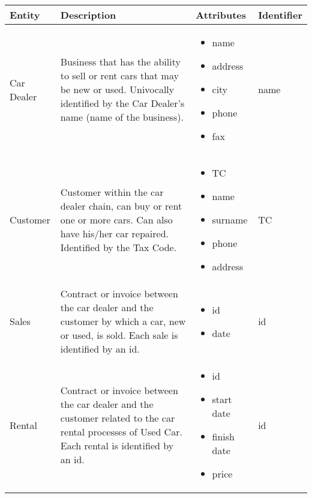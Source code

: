 \begin{longtable}{|p{}|p{} |p{}|p{} |} 
\hline
\textbf{Entity} & \textbf{Description} & \textbf{Attributes} & \textbf{Identifier}  \\\hline


Car Dealer & Business that has the ability to sell or rent cars that may be new or used. Univocally identified by the Car Dealer's name (name of the business). & \begin{itemize}
        \vspace{-1em}
        \item name
        \item address
        \item city
        \item phone
        \item fax
    \end{itemize}
& name\\\hline
 
 Customer & Customer within the car dealer chain, can buy or rent one or more cars. Can also have his/her car repaired. Identified by the Tax Code. & \begin{itemize}
        \vspace{-1em}
        \item TC
        \item name
        \item surname
        \item phone
        \item address
    \end{itemize}
 &  TC \\\hline

 Sales & Contract or invoice between the car dealer and the customer by which a car, new or used, is sold. Each sale is identified by an id. & \begin{itemize}
    \vspace{-1em}
    \item id
    \item date
    \end{itemize}
& id \\\hline

Rental & Contract or invoice between the car dealer and the customer related to the car rental processes of Used Car. Each rental is identified by an id. & \begin{itemize}
        \vspace{-1em}
        \item id
        \item start date
        \item finish date
        \item price
    \end{itemize}
& id\\\hline


\end{longtable}
